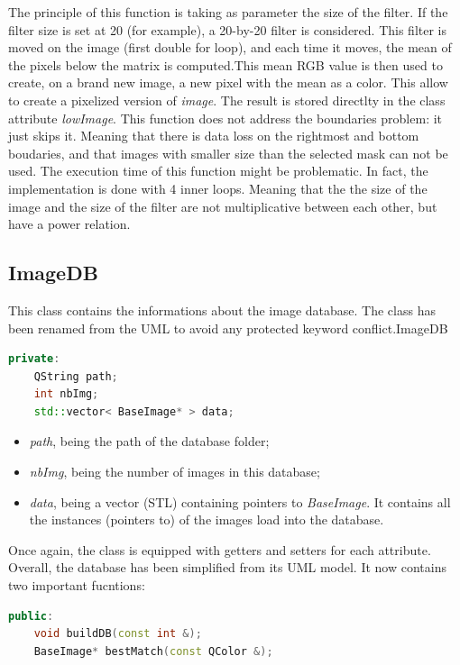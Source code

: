 \documentclass[aps,letterpaper,11pt]{revtex4}
\begin{document}
The principle of this function is taking as parameter the size of the filter. If the filter size is set at 20 (for example), a 20-by-20 filter is considered. This filter is moved on the image (first double for loop), and each time it moves, the mean of the pixels below the matrix is computed.This mean RGB value is then used to create, on a brand new image, a new pixel with the mean as a color.
This allow to create a pixelized version of \textit{image}. The result is stored directlty in the class attribute \textit{lowImage}. This function does not address the boundaries problem: it just skips it. Meaning that there is data loss on the rightmost and bottom boudaries, and that images with smaller size than the selected mask can not be used.
The execution time of this function might be problematic. In fact, the implementation is done with 4 inner loops. Meaning that the the size of the image and the size of the filter are not multiplicative between each other, but have a power relation.

\subsection{ImageDB}
This class contains the informations about the image database. The class has been renamed from the UML to avoid any protected keyword conflict.ImageDB

\begin{lstlisting}[language=C++]
private:
    QString path;
    int nbImg;
    std::vector< BaseImage* > data;
\end{lstlisting}

\begin{itemize}
  \item \textit{path}, being the path of the database folder;
  \item \textit{nbImg}, being the number of images in this database;
  \item\textit{data}, being a vector (STL) containing pointers to \textit{BaseImage}. It contains all the instances (pointers to) of the images load into the database.
\end{itemize}

Once again, the class is equipped with getters and setters for each attribute.
Overall, the database has been simplified from its UML model. It now contains two important fucntions: 

\begin{lstlisting}[language=C++]
public:
    void buildDB(const int &);
    BaseImage* bestMatch(const QColor &);
\end{lstlisting}
\end{document}
